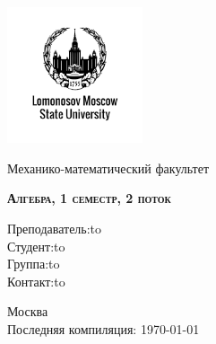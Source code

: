 \documentclass[a4paper, 12pt]{article}
\theoremstyle{definition}
\begin{document}
  \begin{titlepage}
    \newpage
    
    \begin{center}
    \includegraphics[width=4cm]{image/image.png}
    \end{center}
    
    \vspace{4em}
    
    \begin{center}
    \Large Механико-математический факультет  
    \end{center}
    
    \vspace{2em}
    
    \begin{center}
    \large{\textsc{\textbf{Алгебра, 1 семестр, 2 поток}}}
    \end{center}
    
    \vspace{6em}
    

    
    \newbox{\lbox}
    \newlength{\maxl}
    \setlength{\maxl}{\wd\lbox}
    \hfill\parbox{11cm}
    {
    \hspace*{5cm}\hspace*{-5cm}Преподаватель:\hfill\hbox to \\

    \hspace*{5cm}\hspace*{-5cm}Студент:\hfill\hbox to\\

    \hspace*{5cm}\hspace*{-5cm}Группа:\hfill\hbox to \\
    
    \hspace*{5cm}\hspace*{-5cm}Контакт:\hfill\hbox to
    }

    \vspace{\fill}
    
    \begin{center}
    Москва \\Последняя компиляция: \today
    \end{center}
    
  \end{titlepage}
  \tableofcontents
  \fontsize{14pt}{20pt}\selectfont
  \newpage
  \fontsize{14pt}{20pt}\selectfont
\end{document}
